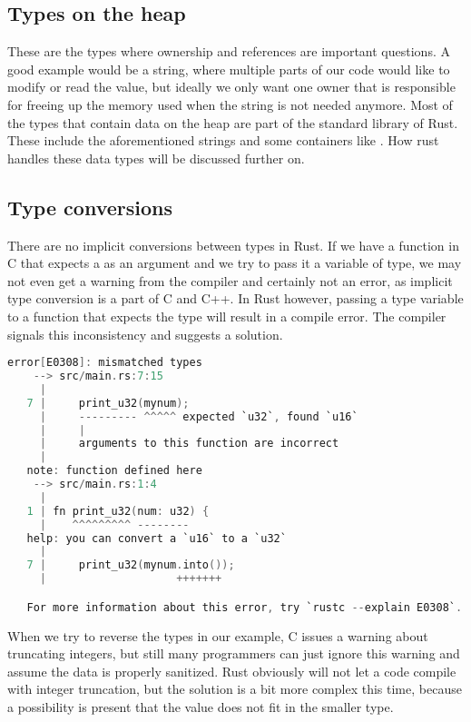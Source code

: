 \subsection{Types on the heap}

These are the types where ownership and references are important questions. A good example would be a string, where multiple parts of our code would like to modify or read the value, but ideally we only want one owner that is responsible for freeing up the memory used when the string is not needed anymore. Most of the types that contain data on the heap are part of the standard library of Rust. These include the aforementioned strings and some containers like . How rust handles these data types will be discussed further on.

\subsection{Type conversions}

There are no implicit conversions between types in Rust. If we have a function in C that expects a  as an argument and we try to pass it a variable of  type, we may not even get a warning from the compiler and certainly not an error, as implicit type conversion is a part of C and C++. In Rust however, passing a  type variable to a function that expects the  type will result in a compile error. The compiler signals this inconsistency and suggests a solution.

\begin{lstlisting}[language=C,frame=single,float=!ht]
    error[E0308]: mismatched types
    --> src/main.rs:7:15
     |
   7 |     print_u32(mynum);
     |     --------- ^^^^^ expected `u32`, found `u16`
     |     |
     |     arguments to this function are incorrect
     |
   note: function defined here
    --> src/main.rs:1:4
     |
   1 | fn print_u32(num: u32) {
     |    ^^^^^^^^^ --------
   help: you can convert a `u16` to a `u32`
     |
   7 |     print_u32(mynum.into());
     |                    +++++++

   For more information about this error, try `rustc --explain E0308`.
\end{lstlisting}

When we try to reverse the types in our example, C issues a warning about truncating integers, but still many programmers can just ignore this warning and assume the data is properly sanitized. Rust obviously will not let a code compile with integer truncation, but the solution is a bit more complex this time, because a possibility is present that the value does not fit in the smaller type.

